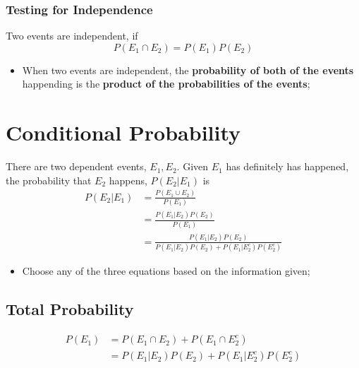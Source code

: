     \subsubsection{Testing for Independence}
    
      Two events are independent, if
      \begin{equation}\label{eq: ch3-independence-test}
        P\left( E_{1} \cap E_{2} \right) = P\left( E_{1} \right) P\left( E_{2} \right)
      \end{equation}
      
      \begin{itemize}
        \item When two events are independent, the \textbf{probability of both of the events} happending is the \textbf{product of the probabilities of the events};
      \end{itemize}
      
\section{Conditional Probability}
  There are two dependent events, $ E_{1}, E_{2} $. Given $ E_{1} $ has definitely has happened, the probability that $ E_{2} $ happens, $ P\left( E_{2} | E_{1} \right) $ is 
  \begin{align}
    P\left( E_{2} | E_{1} \right) &= \frac{ P\left( E_{1} \cup E_{2} \right) }{ P\left( E_{1} \right) } \\
    &= \frac{ P\left( E_{1} | E_{2} \right) P\left( E_{2} \right) }{ P\left( E_{1} \right) } \\
    &= \frac{ P\left( E_{1} | E_{2} \right) P\left( E_{2} \right) }{ P\left( E_{1} | E_{2} \right) P\left( E_{2} \right) + P\left( E_{1} | E_{2}^{c} \right) P\left( E_{2}^{c} \right) }
  \end{align}
  
  \begin{itemize}
    \item Choose any of the three equations based on the information given;
  \end{itemize}
  
  \subsection{Total Probability}
  
    \begin{align}
      P\left( E_{1} \right) &= P\left( E_{1} \cap E_{2} \right) + P\left( E_{1} \cap E_{2}^{c} \right) \\
      &= P\left( E_{1} | E_{2} \right) P\left( E_{2} \right) + P\left( E_{1} | E_{2}^{c} \right) P\left( E_{2}^{c} \right)
    \end{align}
    
